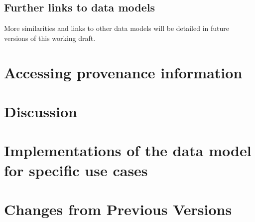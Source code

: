 \documentclass[11pt,a4paper]{ivoa}
\begin{document}
\subsection{Further links to data models}
More similarities and links to other data models will be detailed in future 
versions of this working draft.


\section{Accessing provenance information}


\section{Discussion}


\section{Implementations of the data model for specific use cases}\label{sec:usecases-implementations}



\appendix
\section{Changes from Previous Versions}
\end{document}
